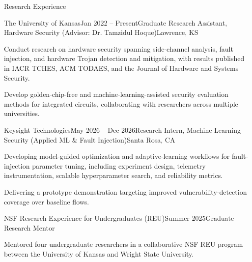 \begin{rSection}{Research Experience}

\begin{rSubsection}{The University of Kansas}{Jan 2022 -- Present}{Graduate Research Assistant, Hardware Security (Advisor: Dr. Tamzidul Hoque)}{Lawrence, KS}
\item Conduct research on hardware security spanning side-channel analysis, fault injection, and hardware Trojan detection and mitigation, with results published in IACR TCHES, ACM TODAES, and the Journal of Hardware and Systems Security.
\item Develop golden-chip-free and machine-learning-assisted security evaluation methods for integrated circuits, collaborating with researchers across multiple universities.
\end{rSubsection}

\begin{rSubsection}{Keysight Technologies}{May 2026 -- Dec 2026}{Research Intern, Machine Learning Security (Applied ML \& Fault Injection)}{Santa Rosa, CA}
\item Developing model-guided optimization and adaptive-learning workflows for fault-injection parameter tuning, including experiment design, telemetry instrumentation, scalable hyperparameter search, and reliability metrics.
\item Delivering a prototype demonstration targeting improved vulnerability-detection coverage over baseline flows.
\end{rSubsection}

\begin{rSubsection}{NSF Research Experience for Undergraduates (REU)}{Summer 2025}{Graduate Research Mentor}{}
\item Mentored four undergraduate researchers in a collaborative NSF REU program between the University of Kansas and Wright State University.
\end{rSubsection}

\end{rSection}
